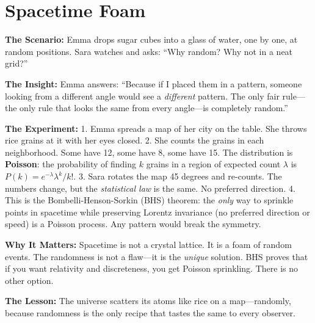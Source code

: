 \documentclass[11pt, a4paper, openany]{book}
\begin{document}
\section{Spacetime Foam}
\begin{thoughtexp}
\textbf{The Scenario:} Emma drops sugar cubes into a glass of water, one by one, at random positions. Sara watches and asks: ``Why random? Why not in a neat grid?''

\textbf{The Insight:} Emma answers: ``Because if I placed them in a pattern, someone looking from a different angle would see a \emph{different} pattern. The only fair rule---the only rule that looks the same from every angle---is completely random.''

\textbf{The Experiment:}
1. Emma spreads a map of her city on the table. She throws rice grains at it with her eyes closed.
2. She counts the grains in each neighborhood. Some have 12, some have 8, some have 15. The distribution is \textbf{Poisson}: the probability of finding $k$ grains in a region of expected count $\lambda$ is $P(k) = e^{-\lambda}\lambda^k/k!$.
3. Sara rotates the map 45 degrees and re-counts. The numbers change, but the \emph{statistical law} is the same. No preferred direction.
4. This is the Bombelli-Henson-Sorkin (BHS) theorem: the \emph{only} way to sprinkle points in spacetime while preserving Lorentz invariance (no preferred direction or speed) is a Poisson process. Any pattern would break the symmetry.

\textbf{Why It Matters:} Spacetime is not a crystal lattice. It is a foam of random events. The randomness is not a flaw---it is the \emph{unique} solution. BHS proves that if you want relativity and discreteness, you get Poisson sprinkling. There is no other option.

\textbf{The Lesson:} The universe scatters its atoms like rice on a map---randomly, because randomness is the only recipe that tastes the same to every observer.
\end{thoughtexp}
\end{document}
